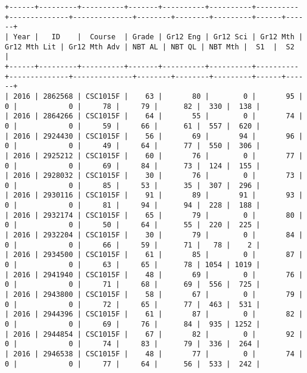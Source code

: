 \begin{sidewaysfigure}
    \centering
    \begin{mdframed}[rightline=false,leftline=false,topline=false]
        \centering
        \begin{BVerbatim}
+------+---------+----------+-------+----------+----------+----------+--------------+--------------+--------+--------+---------+------+------+
| Year |   ID    |  Course  | Grade | Gr12 Eng | Gr12 Sci | Gr12 Mth | Gr12 Mth Lit | Gr12 Mth Adv | NBT AL | NBT QL | NBT Mth |  S1  |  S2  |
+------+---------+----------+-------+----------+----------+----------+--------------+--------------+--------+--------+---------+------+------+
| 2016 | 2862568 | CSC1015F |    63 |       80 |        0 |       95 |            0 |            0 |     78 |     79 |      82 |  330 |  138 |
| 2016 | 2864266 | CSC1015F |    64 |       55 |        0 |       74 |            0 |            0 |     59 |     66 |      61 |  557 |  620 |
| 2016 | 2924430 | CSC1015F |    56 |       69 |       94 |       96 |            0 |            0 |     49 |     64 |      77 |  550 |  306 |
| 2016 | 2925212 | CSC1015F |    60 |       76 |        0 |       77 |            0 |            0 |     69 |     84 |      73 |  124 |  155 |
| 2016 | 2928032 | CSC1015F |    30 |       76 |        0 |       73 |            0 |            0 |     85 |     53 |      35 |  307 |  296 |
| 2016 | 2930116 | CSC1015F |    91 |       89 |       91 |       93 |            0 |            0 |     81 |     94 |      94 |  228 |  188 |
| 2016 | 2932174 | CSC1015F |    65 |       79 |        0 |       80 |            0 |            0 |     50 |     64 |      55 |  220 |  225 |
| 2016 | 2932204 | CSC1015F |    30 |       79 |        0 |       84 |            0 |            0 |     66 |     59 |      71 |   78 |    2 |
| 2016 | 2934500 | CSC1015F |    61 |       85 |        0 |       87 |            0 |            0 |     63 |     65 |      78 | 1054 | 1019 |
| 2016 | 2941940 | CSC1015F |    48 |       69 |        0 |       76 |            0 |            0 |     71 |     68 |      69 |  556 |  725 |
| 2016 | 2943800 | CSC1015F |    58 |       67 |        0 |       79 |            0 |            0 |     72 |     65 |      77 |  463 |  531 |
| 2016 | 2944396 | CSC1015F |    61 |       87 |        0 |       82 |            0 |            0 |     69 |     76 |      84 |  935 | 1252 |
| 2016 | 2944854 | CSC1015F |    67 |       82 |        0 |       92 |            0 |            0 |     74 |     83 |      79 |  336 |  264 |
| 2016 | 2946538 | CSC1015F |    48 |       77 |        0 |       74 |            0 |            0 |     77 |     64 |      56 |  533 |  242 |

\end{BVerbatim}
\end{mdframed}
\end{sidewaysfigure}
